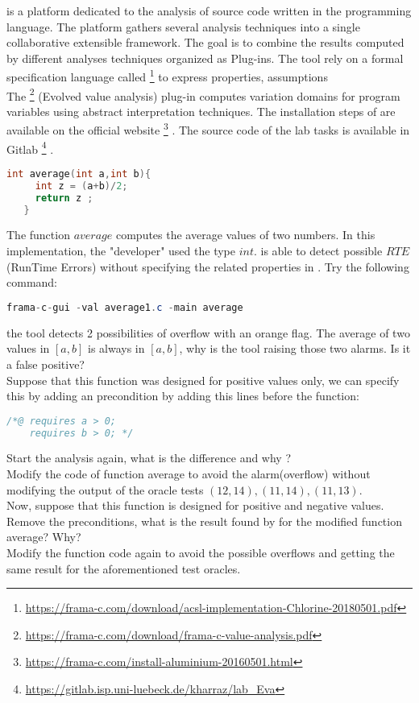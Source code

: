 \documentclass[language=en,sheet=1,prefix]{exercise}
\begin{document}
\framac is a platform dedicated to the analysis of source code written in
the \C programming language. The \framac platform gathers several analysis techniques into a single collaborative extensible framework. The goal is to combine the results computed by different analyses techniques organized as Plug-ins. The tool rely on a formal specification language called \acsl \footnote{\url{https://frama-c.com/download/acsl-implementation-Chlorine-20180501.pdf}} to express properties, assumptions \etc  \\ The \eva \footnote{\url{https://frama-c.com/download/frama-c-value-analysis.pdf}} (Evolved value analysis) plug-in computes variation domains for program variables using abstract interpretation techniques. The installation steps of \framac are available on the official website \footnote{\url{https://frama-c.com/install-aluminium-20160501.html}} . The source code of the lab tasks is available in Gitlab \footnote{\url{https://gitlab.isp.uni-luebeck.de/kharraz/lab_Eva}} .

\begin{lstlisting}[language=c,gobble=2]
   int average(int a,int b){
     int z = (a+b)/2;
     return z ;
   }
\end{lstlisting}
The function $average$ computes the average values of two numbers. In this implementation, the "developer" used the type $int$. 
\eva is able to detect possible $RTE$ (RunTime Errors)  without specifying the related properties in \acsl. Try the following command:

\begin{lstlisting}[language=Java]
 frama-c-gui -val average1.c -main average
\end{lstlisting}

the tool detects 2 possibilities of overflow with an orange flag. The average of two values in $[a,b]$ is always in $[a,b]$, why is the tool raising those two alarms. Is it a false positive?\\

Suppose that this function was designed for positive values only, we can specify this  by adding an \acsl precondition by adding this lines before the function: 
\begin{lstlisting}[language=c]
/*@ requires a > 0;
    requires b > 0; */ 
\end{lstlisting}

Start the analysis again, what is the difference and why ?\\
Modify the code of function average to avoid the alarm(overflow) without modifying the output of the oracle tests $(12,14), (11,14), (11,13)$.\\
Now, suppose that this function is designed for positive and negative values. Remove the preconditions, what is the result found by \eva for the modified function average? Why?\\
Modify the function code again to avoid the possible overflows and getting the same result for the aforementioned test oracles.
\\
\end{document}
